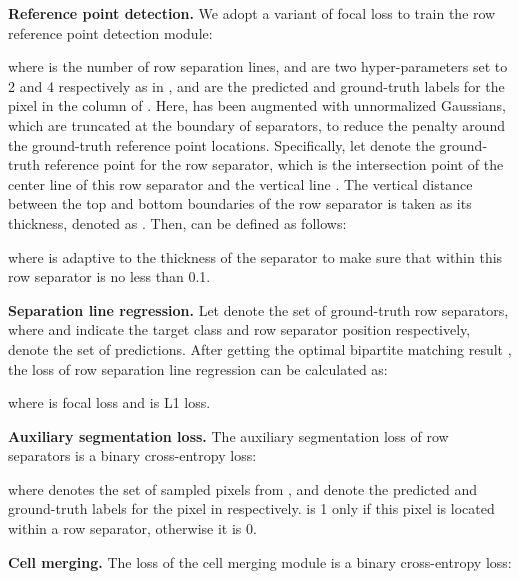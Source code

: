 \documentclass[sigconf]{acmart}
\begin{document}
\textbf{Reference point detection.} We adopt a variant of focal loss \cite{focal2017} to train the row reference point detection module:
\begin{small}

\end{small}

\noindent where  is the number of row separation lines,  and  are two hyper-parameters set to 2 and 4 respectively as in \cite{cornernet2018},  and  are the predicted and ground-truth labels for the  pixel in the  column of . Here,  has been augmented with unnormalized Gaussians, which are truncated at the boundary of separators, to reduce the penalty around the ground-truth reference point locations. Specifically, let  denote the ground-truth reference point for the  row separator, which is the intersection point of the center line of this row separator and the vertical line . The vertical distance between the top and bottom boundaries of the  row separator is taken as its thickness, denoted as . Then,  can be defined as follows:
\begin{small}

\end{small}

\noindent where  is adaptive to the thickness of the separator to make sure that  within this row separator is no less than 0.1. 

\textbf{Separation line regression.} Let  denote the set of ground-truth row separators, where  and  indicate the target class and row separator position respectively,  denote the set of predictions. After getting the optimal bipartite matching result , the loss of row separation line regression can be calculated as:
\begin{small}

\end{small}

\noindent where  is focal loss and  is L1 loss. 


\textbf{Auxiliary segmentation loss.} The auxiliary segmentation loss of row separators is a binary cross-entropy loss:
\begin{small}

\end{small}

\noindent where  denotes the set of sampled pixels from ,  and  denote the predicted and ground-truth labels for the pixel  in  respectively.  is 1 only if this pixel is located within a row separator, otherwise it is 0.


\textbf{Cell merging.} The loss  of the cell merging module is a binary cross-entropy loss:
\begin{small}

\end{small}
\end{document}
